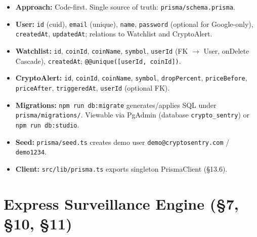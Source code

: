 \documentclass[11pt,a4paper]{report}
\begin{document}
\begin{itemize}[leftmargin=*]
  \item \textbf{Approach:} Code-first. Single source of truth: \texttt{prisma/schema.prisma}.
  \item \textbf{User:} \texttt{id} (cuid), \texttt{email} (unique), \texttt{name}, \texttt{password} (optional for Google-only), \texttt{createdAt}, \texttt{updatedAt}; relations to Watchlist and CryptoAlert.
  \item \textbf{Watchlist:} \texttt{id}, \texttt{coinId}, \texttt{coinName}, \texttt{symbol}, \texttt{userId} (FK $\to$ User, onDelete Cascade), \texttt{createdAt}; \texttt{@@unique([userId, coinId])}.
  \item \textbf{CryptoAlert:} \texttt{id}, \texttt{coinId}, \texttt{coinName}, \texttt{symbol}, \texttt{dropPercent}, \texttt{priceBefore}, \texttt{priceAfter}, \texttt{triggeredAt}, \texttt{userId} (optional FK).
  \item \textbf{Migrations:} \texttt{npm run db:migrate} generates/applies SQL under \texttt{prisma/migrations/}. Viewable via PgAdmin (database \texttt{crypto\_sentry}) or \texttt{npm run db:studio}.
  \item \textbf{Seed:} \texttt{prisma/seed.ts} creates demo user \texttt{demo@cryptosentry.com} / \texttt{demo1234}.
  \item \textbf{Client:} \texttt{src/lib/prisma.ts} exports singleton PrismaClient (\S13.6).
\end{itemize}

\section{Express Surveillance Engine (\S7, \S10, \S11)}
\end{document}
